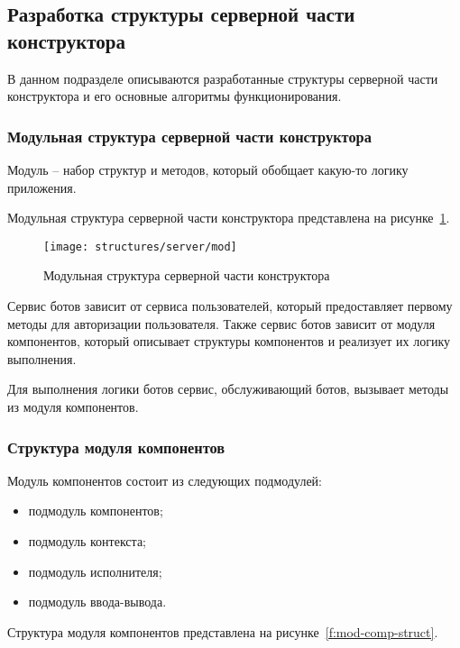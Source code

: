 
\subsection{Разработка структуры серверной части конструктора}


В данном подразделе описываются разработанные структуры серверной части
конструктора и его основные алгоритмы функционирования.

\subsubsection{Модульная структура серверной части конструктора}

Модуль – набор структур и методов, который обобщает какую-то логику
приложения.

Модульная структура серверной части конструктора представлена на
рисунке~\ref{f:mod-server-struct}.

\begin{figure}[ht]
	\centering
	\vspace{\toppaddingoffigure}
	\texttt{[image: structures/server/mod]}
	\caption{Модульная структура серверной части конструктора}
	\label{f:mod-server-struct}
\end{figure}

Сервис ботов зависит от сервиса пользователей, который предоставляет
первому методы для авторизации пользователя. Также сервис ботов зависит
от модуля компонентов, который описывает структуры компонентов и
реализует их логику выполнения.

Для выполнения логики ботов сервис, обслуживающий ботов, вызывает
методы из модуля компонентов.

\subsubsection{Структура модуля компонентов}

Модуль компонентов состоит из следующих подмодулей:
\begin{itemize}
	\item подмодуль компонентов;
	\item подмодуль контекста;
	\item подмодуль исполнителя;
	\item подмодуль ввода-вывода.
\end{itemize}

Структура модуля компонентов представлена на рисунке~\ref{f:mod-comp-struct}.

